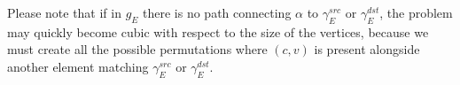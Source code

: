 Please note that if in $g_E$ there is no path connecting $\alpha$ to $\gamma_E^{src}$ or $\gamma_E^{dst}$, the problem may quickly become cubic with respect to the size of the vertices, because we must create all the possible permutations where $(c,v)$ is present alongside another element matching $\gamma_E^{src}$ or $\gamma_E^{dst}$.